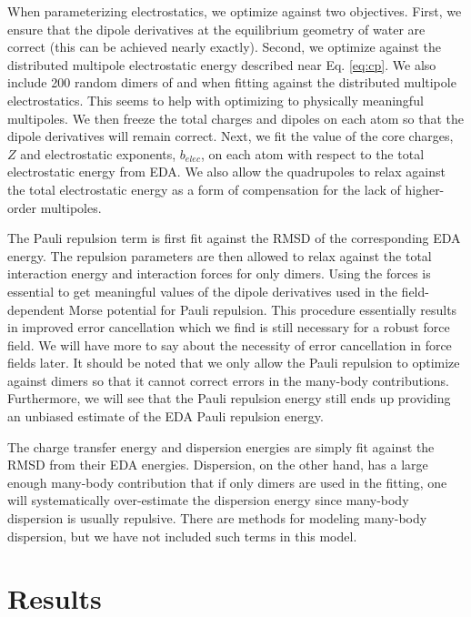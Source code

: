 \documentclass[journal=jctcce,manuscript=article]{achemso}
\begin{document}
When parameterizing electrostatics, we optimize against two objectives. First, we ensure that the dipole derivatives at the equilibrium geometry of water are correct (this can be achieved nearly exactly). Second, we optimize against the distributed multipole electrostatic energy described near Eq. \ref{eq:cp}. We also include 200 random dimers of  and  when fitting against the distributed multipole electrostatics. This seems to help with optimizing to physically meaningful multipoles. We then freeze the total charges and dipoles on each atom so that the dipole derivatives will remain correct. Next, we fit the value of the core charges, $Z$ and electrostatic exponents, $b_{elec}$, on each atom with respect to the total electrostatic energy from EDA. We also allow the quadrupoles to relax against the total electrostatic energy as a form of compensation for the lack of higher-order multipoles.

The Pauli repulsion term is first fit against the RMSD of the corresponding EDA energy. The repulsion parameters are then allowed to relax against the total interaction energy and interaction forces for only dimers. Using the forces is essential to get meaningful values of the dipole derivatives used in the field-dependent Morse potential for Pauli repulsion. This procedure essentially results in improved error cancellation which we find is still necessary for a robust force field. We will have more to say about the necessity of error cancellation in force fields later. It should be noted that we only allow the Pauli repulsion to optimize against dimers so that it cannot correct errors in the many-body contributions. Furthermore, we will see that the Pauli repulsion energy still ends up providing an unbiased estimate of the EDA Pauli repulsion energy.

The charge transfer energy and dispersion energies are simply fit against the RMSD from their EDA energies. Dispersion, on the other hand, has a large enough many-body contribution that if only dimers are used in the fitting, one will systematically over-estimate the dispersion energy since many-body dispersion is usually repulsive. There are methods for modeling many-body dispersion, but we have not included such terms in this model.\cite{anatole2010two,van2018new} 

\section*{Results}
\end{document}
